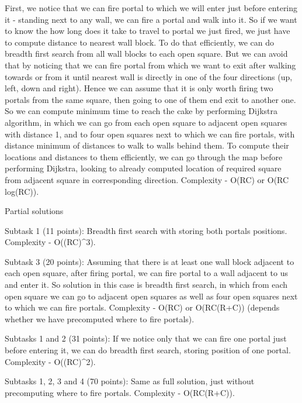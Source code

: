 First, we notice that we can fire portal to which we will enter just before entering it - standing next to any wall, we can fire a portal and walk into it. So if we want to know the how long does it take to travel to portal we just fired, we just have to compute distance to nearest wall block. To do that efficiently, we can do breadth first search from all wall blocks to each open square. But we can avoid that by noticing that we can fire portal from which we want to exit after walking towards or from it until nearest wall is directly in one of the four directions (up, left, down and right). Hence we can assume that it is only worth firing two portals from the same square, then going to one of them end exit to another one.
So we can compute minimum time to reach the cake by performing Dijkstra algorithm, in which we can go from each open square to adjacent open squares with distance 1, and to four open squares next to which we can fire portals, with distance minimum of distances to walk to walls behind them. To compute their locations and distances to them efficiently, we can go through the map before performing Dijkstra, looking to already computed location of required square from adjacent square in corresponding direction.
Complexity - O(RC) or O(RC log(RC)).

Partial solutions

Subtask 1 (11 points):
Breadth first search with storing both portals positions.
Complexity - O((RC)^3).

Subtask 3 (20 points):
Assuming that there is at least one wall block adjacent to each open square, after firing portal, we can fire portal to a wall adjacent to us and enter it. So solution in this case is breadth first search, in which from each open square we can go to adjacent open squares as well as four open squares next to which we can fire portals.
Complexity - O(RC) or O(RC(R+C)) (depends whether we have precomputed where to fire portals).

Subtasks 1 and 2 (31 points):
If we notice only that we can fire one portal just before entering it, we can do breadth first search, storing position of one portal.
Complexity - O((RC)^2).

Subtasks 1, 2, 3 and 4 (70 points):
Same as full solution, just without precomputing where to fire portals.
Complexity - O(RC(R+C)).